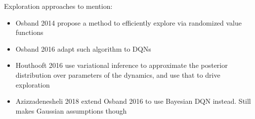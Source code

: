 \documentclass{article}
\begin{document}
Exploration approaches to mention:
\begin{itemize}
\item Osband 2014 propose a method to efficiently explore via randomized value functions
\item Osband 2016 adapt such algorithm to DQNs
\item Houthooft 2016 use variational inference to approximate the posterior distribution over parameters of the dynamics, and use that to drive exploration
\item Azizzadenesheli 2018 extend Osband 2016 to use Bayesian DQN instead. Still makes Gaussian assumptions though
\end{itemize}
\end{document}
